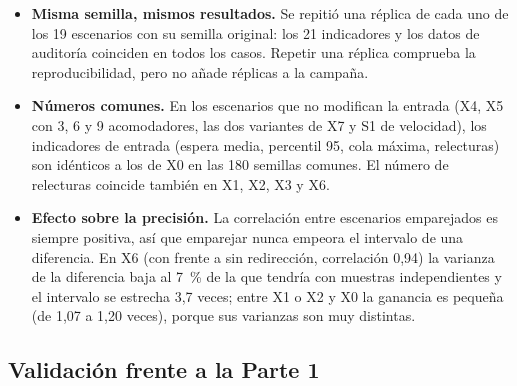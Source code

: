 \begin{itemize}
  \item \textbf{Misma semilla, mismos resultados.} Se repitió una réplica de cada
    uno de los 19 escenarios con su semilla original: los 21 indicadores y los
    datos de auditoría coinciden en todos los casos. Repetir una réplica comprueba
    la reproducibilidad, pero no añade réplicas a la campaña.
  \item \textbf{Números comunes.} En los escenarios que no modifican la entrada
    (X4, X5 con 3, 6 y 9 acomodadores, las dos variantes de X7 y S1 de
    velocidad), los indicadores de entrada (espera media, percentil 95, cola
    máxima, relecturas) son idénticos a los de X0 en las 180 semillas comunes. El
    número de relecturas coincide también en X1, X2, X3 y X6.
  \item \textbf{Efecto sobre la precisión.} La correlación entre escenarios
    emparejados es siempre positiva, así que emparejar nunca empeora el intervalo
    de una diferencia. En X6 (con frente a sin redirección, correlación 0,94) la
    varianza de la diferencia baja al 7~\% de la que tendría con muestras
    independientes y el intervalo se estrecha 3,7 veces; entre X1 o X2 y X0 la
    ganancia es pequeña (de 1,07 a 1,20 veces), porque sus varianzas son muy
    distintas.
\end{itemize}

\subsection{Validación frente a la Parte 1}

